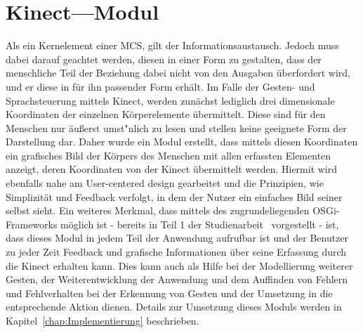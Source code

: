 \section{Kinect---Modul}
Als ein Kernelement einer \gls{MCS}, gilt der Informationsaustausch. Jedoch muss dabei darauf geachtet werden, diesen in einer Form zu gestalten, dass der menschliche Teil der Beziehung dabei nicht von den Ausgaben \"uberfordert wird, und er diese in f\"ur ihn passender Form erh\"alt. Im Falle der Gesten- und Sprachsteuerung mittels Kinect, werden zun\"achst lediglich drei dimensionale Koordinaten der einzelnen K\"orperelemente \"ubermittelt. Diese sind f\"ur den Menschen nur \"au\ss erst umst\a"nlich zu lesen und stellen keine geeignete Form der Darstellung dar. Daher wurde ein Modul erstellt, dass mittels diesen Koordinaten ein grafisches Bild der K\"orpers des Menschen mit allen erfassten Elementen anzeigt, deren Koordinaten von der Kinect \"ubermittelt werden. Hiermit wird ebenfalls nahe am User-centered design gearbeitet und die Prinzipien, wie Simplizit\"at und Feedback verfolgt, in dem der Nutzer ein einfaches Bild seiner selbst sieht.
\newline
Ein weiteres Merkmal, dass mittels des zugrundeliegenden OSGi-Frameworks m\"oglich ist - bereits in Teil 1 der Studienarbeit~\cite{bib:Ebner_Werling} vorgestellt - ist, dass dieses Modul in jedem Teil der Anwendung aufrufbar ist und der Benutzer zu jeder Zeit Feedback und grafische Informationen \"uber seine Erfassung durch die Kinect erhalten kann. Dies kann auch als Hilfe bei der Modellierung weiterer Gesten, der Weiterentwicklung der Anwendung und dem Auffinden von Fehlern und Fehlverhalten bei der Erkennung von Gesten und der Umsetzung in die entsprechende Aktion dienen.
\newline
Details zur Umsetzung dieses Moduls werden in Kapitel~\ref{chap:Implementierung} beschrieben.